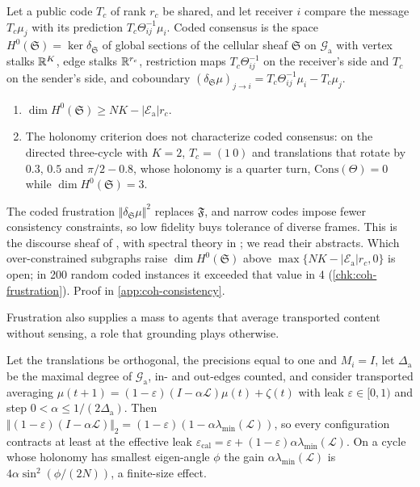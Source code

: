 \begin{proposition}\label{prop:coh-coded}
Let a public code $T_c$ of rank $r_c$ be shared, and let receiver $i$ compare the message $T_c\mu_j$ with its prediction $T_c\Theta_{ij}^{-1}\mu_i$. Coded consensus is the space $H^0(\mathfrak S)=\ker\delta_{\mathfrak S}$ of global sections of the cellular sheaf $\mathfrak S$ on $\mathcal G_{\mathrm a}$ with vertex stalks $\mathbb{R}^K$, edge stalks $\mathbb{R}^{r_c}$, restriction maps $T_c\Theta_{ij}^{-1}$ on the receiver's side and $T_c$ on the sender's side, and coboundary $(\delta_{\mathfrak S}\mu)_{j\to i}=T_c\Theta_{ij}^{-1}\mu_i-T_c\mu_j$.
\begin{enumerate}\renewcommand{\labelenumi}{(\alph{enumi})}
\item $\dim H^0(\mathfrak S)\ge NK-|\mathcal E_{\mathrm a}|r_c$.
\item The holonomy criterion does not characterize coded consensus: on the directed three-cycle with $K=2$, $T_c=(1\ 0)$ and translations that rotate by $0.3$, $0.5$ and $\pi/2-0.8$, whose holonomy is a quarter turn, $\mathrm{Cons}(\Theta)=0$ while $\dim H^0(\mathfrak S)=3$.
\end{enumerate}
\end{proposition}

The coded frustration $\Vert\delta_{\mathfrak S}\mu\Vert^2$ replaces $\mathfrak F$, and narrow codes impose fewer consistency constraints, so low fidelity buys tolerance of diverse frames. This is the discourse sheaf of \citet{hansen2021opinion}, with spectral theory in \citet{hansen2019toward}; we read their abstracts. Which over-constrained subgraphs raise $\dim H^0(\mathfrak S)$ above $\max\{NK-|\mathcal E_{\mathrm a}|r_c,0\}$ is open; in 200 random coded instances it exceeded that value in 4 (\cref{chk:coh-frustration}). Proof in \cref{app:coh-consistency}.

Frustration also supplies a mass to agents that average transported content without sensing, a role that grounding plays otherwise.

\begin{proposition}\label{prop:coh-frustration-grounding}
Let the translations be orthogonal, the precisions equal to one and $M_i=I$, let $\Delta_{\mathrm a}$ be the maximal degree of $\mathcal G_{\mathrm a}$, in- and out-edges counted, and consider transported averaging $\mu(t+1)=(1-\varepsilon)(I-\alpha\mathcal L)\mu(t)+\zeta(t)$ with leak $\varepsilon\in[0,1)$ and step $0<\alpha\le1/(2\Delta_{\mathrm a})$. Then $\Vert(1-\varepsilon)(I-\alpha\mathcal L)\Vert_2=(1-\varepsilon)(1-\alpha\lambda_{\min}(\mathcal L))$, so every configuration contracts at least at the effective leak $\varepsilon_{\mathrm{cal}}=\varepsilon+(1-\varepsilon)\alpha\lambda_{\min}(\mathcal L)$. On a cycle whose holonomy has smallest eigen-angle $\phi$ the gain $\alpha\lambda_{\min}(\mathcal L)$ is $4\alpha\sin^2(\phi/(2N))$, a finite-size effect.
\end{proposition}

